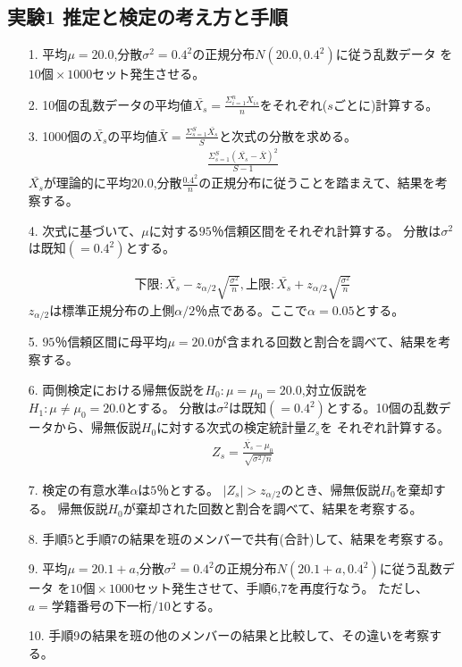 \documentclass[12pt]{jarticle}
\begin{document}
\subsection{実験1 推定と検定の考え方と手順}
\begin{itemize}
    \item [1.]平均$\mu=20.0$,分散$\sigma^2=0.4^2$の正規分布$N(20.0,0.4^2)$に従う乱数データ
          を$10個\times 1000セット$発生させる。
    \item [2.]10個の乱数データの平均値$\bar{X_s}=\frac{\Sigma^{n}_{i=1}X_{is}}{n}$をそれぞれ($s$ごとに)計算する。
    \item [3.]1000個の$\bar{X_s}$の平均値$\bar{X}=\frac{\Sigma^{S}_{s=1}\bar{X_s}}{S}$と次式の分散を求める。
          \begin{eqnarray}
              \frac{\Sigma^{S}_{s=1}(\bar{X_s}-\bar{X})^2}{S-1}\nonumber
          \end{eqnarray}
          $\bar{X_s}$が理論的に平均$20.0$,分散$\frac{0.4^2}{n}$の正規分布に従うことを踏まえて、結果を考察する。
    \item [4.]次式に基づいて、$\mu$に対する$95％$信頼区間をそれぞれ計算する。
          分散は$\sigma^2$は既知$(=0.4^2)$とする。

          \begin{eqnarray}
              下限:\bar{X_s}-z_{\alpha/2}\sqrt{\frac{\sigma^2}{n}},　上限:\bar{X_s}+z_{\alpha/2}\sqrt{\frac{\sigma^2}{n}}\nonumber
          \end{eqnarray}
          $z_{\alpha/2}$は標準正規分布の上側$\alpha/2％$点である。ここで$\alpha=0.05$とする。
    \item [5.]$95％$信頼区間に母平均$\mu=20.0$が含まれる回数と割合を調べて、結果を考察する。
    \item [6.]両側検定における帰無仮説を$H_0:\mu=\mu_0=20.0$,対立仮説を$H_1:\mu\neq\mu_0=20.0$とする。
          分散は$\sigma^2$は既知$(=0.4^2)$とする。10個の乱数データから、帰無仮説$H_0$に対する次式の検定統計量$Z_s$を
          それぞれ計算する。
          \begin{eqnarray}
              Z_s=\frac{\bar{X_s}-\mu_0}{\sqrt{\sigma^2/n}}\nonumber
          \end{eqnarray}
    \item [7.]検定の有意水準$\alpha$は$5％$とする。
          $|Z_s|>z_{\alpha/2}$のとき、帰無仮説$H_0$を棄却する。
          帰無仮説$H_0$が棄却された回数と割合を調べて、結果を考察する。
    \item [8.]手順5と手順7の結果を班のメンバーで共有(合計)して、結果を考察する。
    \item [9.]平均$\mu=20.1+a$,分散$\sigma^2=0.4^2$の正規分布$N(20.1+a,0.4^2)$に従う乱数データ
          を$10個\times 1000セット$発生させて、手順6,7を再度行なう。
          ただし、$a=学籍番号の下一桁/10$とする。
    \item [10.]手順9の結果を班の他のメンバーの結果と比較して、その違いを考察する。
\end{itemize}
\end{document}
